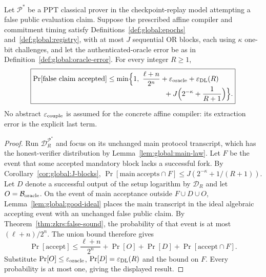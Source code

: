 \begin{theorem}\label{thm:global:finite-sound}
Let $\mathcal P^*$ be a PPT classical
prover in the checkpoint-replay model
attempting a false public evaluation
claim. Suppose the prescribed affine
compiler and commitment timing satisfy
Definitions~\ref{def:global:epochs}
and~\ref{def:global:registry},
with at most $J$ sequential OR blocks,
each using $\kappa$ one-bit challenges,
and let the authenticated-oracle
error be as in
Definition~\ref{def:global:oracle-error}.
For every integer $R\ge1$,
\[
 \boxed{
 \begin{aligned}
 \Pr[\mathrm{false\ claim\ accepted}]
 &\le \min\Bigl\{1,\
 \frac{\ell+n}{2^n}
 +\varepsilon_{\rm oracle}
 +\varepsilon_{\rm DL}(R)\\[-1mm]
 &\hspace{28mm}
 +J\Bigl(2^{-\kappa}+\frac1{R+1}\Bigr)
 \Bigr\}.
 \end{aligned}}
\]
No abstract $\varepsilon_{\rm couple}$
is assumed for the concrete affine
compiler: its extraction error is
the explicit last term.
\end{theorem}
\begin{proof}
Run $\mathcal D_R^{\mathcal P^*}$
and focus on its unchanged main
protocol transcript, which has
the honest-verifier distribution
by Lemma~\ref{lem:global:main-law}.
Let $F$ be the event that some
accepted mandatory block lacks
a successful fork. By
Corollary~\ref{cor:global:J-blocks},
$\Pr[\mathrm{main\ accepts}\cap F]
\le J(2^{-\kappa}+1/(R+1))$.
Let $D$ denote a successful
output of the setup logarithm
by $\mathcal D_R$ and let
$O=\mathcal B_{\rm oracle}$.
On the event of main acceptance
outside $F\cup D\cup O$,
Lemma~\ref{lem:global:good-ideal}
places the main transcript in
the ideal algebraic accepting
event with an unchanged false
public claim.
By Theorem~\ref{thm:zkrs:false-sound},
the probability of that event
is at most $(\ell+n)/2^n$.
The union bound therefore gives
\[
 \Pr[\mathrm{accept}]
 \le\frac{\ell+n}{2^n}
  +\Pr[O]+\Pr[D]
  +\Pr[\mathrm{accept}\cap F].
\]
Substitute
$\Pr[O]\le\varepsilon_{\rm oracle}$,
$\Pr[D]=\varepsilon_{\rm DL}(R)$
and the bound on $F$.
Every probability is at most one,
giving the displayed result.
\end{proof}

